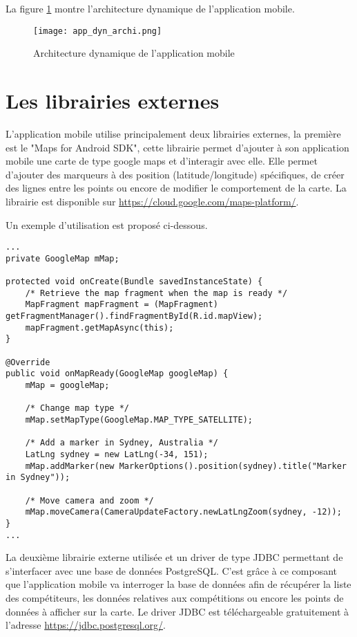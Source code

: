 La figure \ref{fig:app_dyn_archi} montre l'architecture dynamique de l'application mobile. 

\begin{figure}[htb]
\centering 
\texttt{[image: app\_dyn\_archi.png]} 
\caption{Architecture dynamique de l'application mobile}
\label{fig:app_dyn_archi}
\end{figure}

\section{Les librairies externes}

L'application mobile utilise principalement deux librairies externes, la première est le "Maps for Android SDK", cette librairie permet d'ajouter à son application mobile une carte de type google maps et d'interagir avec elle. Elle permet d'ajouter des marqueurs à des position (latitude/longitude) spécifiques, de créer des lignes entre les points ou encore de modifier le comportement de la carte. La librairie est disponible sur \url{https://cloud.google.com/maps-platform/}.

Un exemple d'utilisation est proposé ci-dessous.


\begin{lstlisting}[style=JavaStyle]
...
private GoogleMap mMap;

protected void onCreate(Bundle savedInstanceState) {
	/* Retrieve the map fragment when the map is ready */
	MapFragment mapFragment = (MapFragment) getFragmentManager().findFragmentById(R.id.mapView);
	mapFragment.getMapAsync(this);
}

@Override
public void onMapReady(GoogleMap googleMap) {
	mMap = googleMap;

	/* Change map type */
	mMap.setMapType(GoogleMap.MAP_TYPE_SATELLITE);

	/* Add a marker in Sydney, Australia */
	LatLng sydney = new LatLng(-34, 151);
	mMap.addMarker(new MarkerOptions().position(sydney).title("Marker in Sydney"));

	/* Move camera and zoom */
	mMap.moveCamera(CameraUpdateFactory.newLatLngZoom(sydney, -12));
}
...
\end{lstlisting}

La deuxième librairie externe utilisée et un driver de type JDBC permettant de s'interfacer avec une base de données PostgreSQL. C'est grâce à ce composant que l'application mobile va interroger la base de données afin de récupérer la liste des compétiteurs, les données relatives aux compétitions ou encore les points de données à afficher sur la carte. Le driver JDBC est téléchargeable gratuitement à l'adresse \url{https://jdbc.postgresql.org/}.

